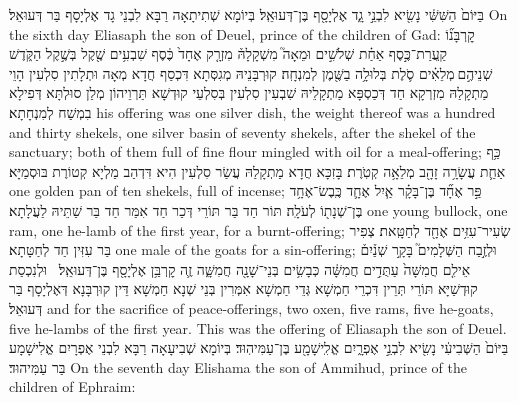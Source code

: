 {בַּיּוֹם֙ הַשִּׁשִּׁ֔י נָשִׂ֖יא לִבְנֵ֣י גָ֑ד אֶלְיָסָ֖ף בֶּן־דְּעוּאֵֽל׃}
{בְּיוֹמָא שְׁתִיתָאָה רַבָּא לִבְנֵי גָד אֶלְיָסָף בַּר דְּעוּאֵל׃}
{On the sixth day Eliasaph the son of Deuel, prince of the children of Gad:}{}
{קׇרְבָּנ֞וֹ קַֽעֲרַת־כֶּ֣סֶף אַחַ֗ת שְׁלֹשִׁ֣ים וּמֵאָה֮ מִשְׁקָלָהּ֒ מִזְרָ֤ק אֶחָד֙ כֶּ֔סֶף שִׁבְעִ֥ים שֶׁ֖קֶל בְּשֶׁ֣קֶל הַקֹּ֑דֶשׁ שְׁנֵיהֶ֣ם \legarmeh  מְלֵאִ֗ים סֹ֛לֶת בְּלוּלָ֥ה בַשֶּׁ֖מֶן לְמִנְחָֽה׃}
{קוּרְבָּנֵיהּ מְגִסְּתָא דִּכְסַף חֲדָא מְאָה וּתְלָתִין סִלְעִין הָוֵי מַתְקָלַהּ מִזְרְקָא חַד דְּכַסְפָּא מַתְקָלֵיהּ שִׁבְעִין סִלְעִין בְּסִלְעֵי קוּדְשָׁא תַּרְוֵיהוֹן מְלַן סוּלְתָּא דְּפִילָא בִמְשַׁח לְמִנְחָתָא׃}
{his offering was one silver dish, the weight thereof was a hundred and thirty shekels, one silver basin of seventy shekels, after the shekel of the sanctuary; both of them full of fine flour mingled with oil for a meal-offering;}{}
{כַּ֥ף אַחַ֛ת עֲשָׂרָ֥ה זָהָ֖ב מְלֵאָ֥ה קְטֹֽרֶת׃}
{בָּזִכָּא חֲדָא מַתְקָלַהּ עֲשַׂר סִלְעִין הִיא דִּדְהַב מַלְיָא קְטוֹרֶת בּוּסְמַיָּא׃}
{one golden pan of ten shekels, full of incense;}{}
{פַּ֣ר אֶחָ֞ד בֶּן־בָּקָ֗ר אַ֧יִל אֶחָ֛ד כֶּֽבֶשׂ־אֶחָ֥ד בֶּן־שְׁנָת֖וֹ לְעֹלָֽה׃}
{תּוֹר חַד בַּר תּוֹרֵי דְּכַר חַד אִמַּר חַד בַּר שַׁתֵּיהּ לַעֲלָתָא׃}
{one young bullock, one ram, one he-lamb of the first year, for a burnt-offering;}{}
{שְׂעִיר־עִזִּ֥ים אֶחָ֖ד לְחַטָּֽאת׃}
{צְפִיר בַּר עִזִּין חַד לְחַטָּתָא׃}
{one male of the goats for a sin-offering;}{}
{וּלְזֶ֣בַח הַשְּׁלָמִים֮ בָּקָ֣ר שְׁנַ֒יִם֒ אֵילִ֤ם חֲמִשָּׁה֙ עַתֻּדִ֣ים חֲמִשָּׁ֔ה כְּבָשִׂ֥ים בְּנֵי־שָׁנָ֖ה חֲמִשָּׁ֑ה זֶ֛ה קׇרְבַּ֥ן אֶלְיָסָ֖ף בֶּן־דְּעוּאֵֽל׃ \petucha }
{וּלְנִכְסַת קוּדְשַׁיָּא תּוֹרֵי תְּרֵין דִּכְרֵי חַמְשָׁא גְּדֵי חַמְשָׁא אִמְּרִין בְּנֵי שְׁנָא חַמְשָׁא דֵּין קוּרְבָּנָא דְּאֶלְיָסָף בַּר דְּעוּאֵל׃}
{and for the sacrifice of peace-offerings, two oxen, five rams, five he-goats, five he-lambs of the first year. This was the offering of Eliasaph the son of Deuel.}{}
{בַּיּוֹם֙ הַשְּׁבִיעִ֔י נָשִׂ֖יא לִבְנֵ֣י אֶפְרָ֑יִם אֱלִֽישָׁמָ֖ע בֶּן־עַמִּיהֽוּד׃}
{בְּיוֹמָא שְׁבִיעָאָה רַבָּא לִבְנֵי אֶפְרָיִם אֱלִישָׁמָע בַּר עַמִּיהוּד׃}
{On the seventh day Elishama the son of Ammihud, prince of the children of Ephraim:}{}

